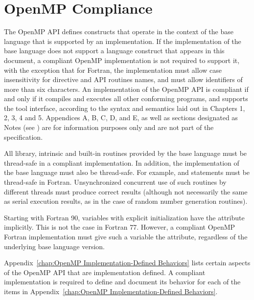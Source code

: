 \section{OpenMP Compliance}
\label{sec:OpenMP Compliance}
The OpenMP API defines constructs that operate in the context of the
base language that is supported by an implementation. If the
implementation of the base language does not support a language
construct that appears in this document, a compliant OpenMP
implementation is not required to support it, with the exception that
for Fortran, the implementation must allow case insensitivity for
directive and API routines names, and must allow identifiers of more
than six characters. An implementation of the OpenMP API is compliant
if and only if it compiles and executes all other conforming programs,
and supports the tool interface, according to the syntax and semantics
laid out in Chapters 1, 2, 3, 4 and 5. Appendices A, B, C, D, and E,
as well as sections designated as Notes (see ) are for information purposes only and are not
part of the specification.

All library, intrinsic and built-in routines provided by the base language must be
thread-safe in a compliant implementation. In addition, the implementation of the base 
language must also be thread-safe. For example,  and  
statements must be thread-safe in Fortran. Unsynchronized concurrent use of such 
routines by different threads must produce correct results (although not necessarily the 
same as serial execution results, as in the case of random number generation routines).

Starting with Fortran 90, variables with explicit initialization have the  attribute 
implicitly. This is not the case in Fortran 77. However, a compliant OpenMP Fortran 
implementation must give such a variable the  attribute, regardless of the 
underlying base language version.

Appendix~\ref{chap:OpenMP Implementation-Defined Behaviors} 
lists certain aspects of the OpenMP API that are implementation defined. A 
compliant implementation is required to define and document its behavior for each of 
the items in Appendix~\ref{chap:OpenMP Implementation-Defined Behaviors}.

